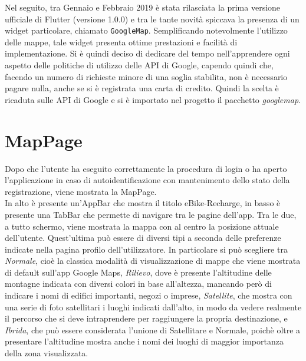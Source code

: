 Nel seguito, tra Gennaio e Febbraio 2019 è stata rilasciata la prima versione
ufficiale di Flutter (versione 1.0.0) e tra le tante novità spiccava la presenza
di un widget particolare, chiamato \texttt{GoogleMap}. Semplificando notevolmente
l'utilizzo delle mappe, tale widget presenta ottime prestazioni e facilità di
implementazione. Si è quindi deciso di dedicare del tempo nell'apprendere ogni
aspetto delle politiche di utilizzo delle API di Google, capendo quindi che,
facendo un numero di richieste minore di una soglia stabilita, non è necessario
pagare nulla, anche se si è registrata una carta di credito. Quindi la scelta è
ricaduta sulle API di Google e si è importato nel progetto il pacchetto
\textit{googlemap}.

\section{MapPage}
Dopo che l'utente ha eseguito correttamente la procedura di login o ha aperto
l'applicazione in caso di autoidentificazione con mantenimento dello stato della
registrazione, viene mostrata la MapPage. \\
In alto è presente un'AppBar che 
mostra il titolo eBike-Recharge, in basso è presente una TabBar che permette di
navigare tra le pagine dell'app. Tra le due, a tutto schermo, viene mostrata la
mappa con al centro la posizione attuale dell'utente. Quest'ultima può essere di
diversi tipi a seconda delle preferenze indicate nella pagina profilo
dell'utilizzatore. In particolare si può scegliere tra \textit{Normale}, cioè la
classica modalità di visualizzazione di mappe che viene mostrata di default
sull'app Google Maps, \textit{Rilievo}, dove è presente l'altitudine delle
montagne indicata con diversi colori in base all'altezza, mancando però
di indicare i nomi di edifici importanti, negozi o imprese, \textit{Satellite},
che mostra con una serie di foto satellitari i luoghi indicati dall'alto, in
modo da vedere realmente il percorso che si deve intraprendere
per raggiungere la propria destinazione, e \textit{Ibrida}, che può essere
considerata l'unione di Satellitare e Normale, poichè oltre a presentare
l'altitudine mostra anche i nomi dei luoghi di maggior importanza della zona
visualizzata.

